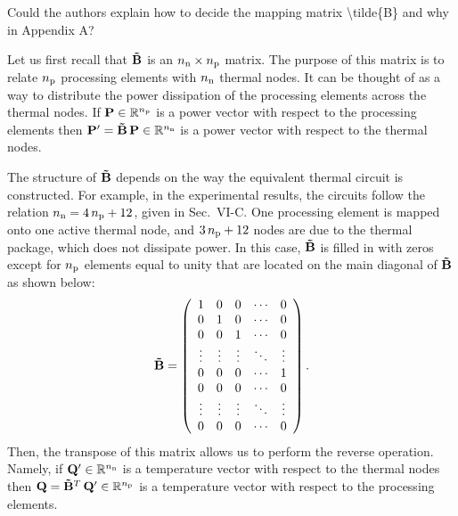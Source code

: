 \begin{reviewer}
Could the authors explain how to decide the mapping matrix \textbackslash{}tilde\{B\} and why in Appendix A?
\end{reviewer}
\begin{authors}
Let us first recall that $\mM$ is an ${n_\text{n}} \times {n_\text{p}}$ matrix.
The purpose of this matrix is to relate ${n_\text{p}}$ processing elements with ${n_\text{n}}$ thermal nodes.
It can be thought of as a way to distribute the power dissipation of the processing elements across the thermal nodes.
If $\mathbf{P} \in \mathbb{R}^{n_\text{p}}$ is a power vector with respect to the processing elements then $\v{P}' = \mM \, \v{P} \in \real^\nnodes$ is a power vector with respect to the thermal nodes.

The structure of $\mM$ depends on the way the equivalent thermal circuit is constructed.
For example, in the experimental results, the circuits follow the relation ${n_\text{n}} = 4 \, {n_\text{p}} + 12$, given in Sec.~VI-C.
One processing element is mapped onto one active thermal node, and $3 \, {n_\text{p}} + 12$ nodes are due to the thermal package, which does not dissipate power.
In this case, $\mM$ is filled in with zeros except for ${n_\text{p}}$ elements equal to unity that are located on the main diagonal of $\mM$ as shown below:
\[
  \mM = \left(
    \begin{array}{ccccc}
      1 & 0 & 0 & \cdots & 0 \\
      0 & 1 & 0 & \cdots & 0 \\
      0 & 0 & 1 & \cdots & 0 \\
      \vdots & \vdots & \vdots & \ddots & \vdots \\
      0 & 0 & 0 & \cdots & 1 \\
      0 & 0 & 0 & \cdots & 0 \\
      \vdots & \vdots & \vdots & \ddots & \vdots \\
      0 & 0 & 0 & \cdots & 0
    \end{array}
  \right).
\]
Then, the transpose of this matrix allows us to perform the reverse operation.
Namely, if $\mathbf{Q}' \in \mathbb{R}^{n_\text{n}}$ is a temperature vector with respect to the thermal nodes then $\v{Q} = \mM^T \, \v{Q}' \in \real^\nprocs$ is a temperature vector with respect to the processing elements.

\begin{actions}
\end{actions}
\end{authors}

